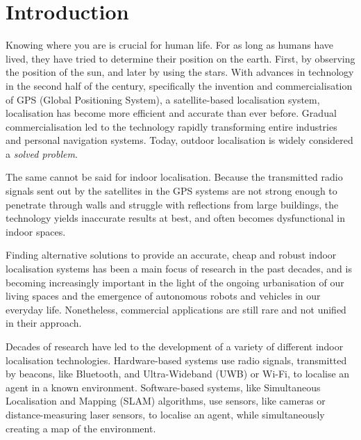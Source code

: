 \documentclass[a4paper]{article}
\begin{document}
  
  \newpage

  \tableofcontents
  \listoftables
  \listoffigures
  \newpage

  \begin{abstract} %
    \lipsum[1]
  \end{abstract}

  \section{Introduction}
  \label{sec:introduction}

  Knowing where you are is crucial for human life. For as long as humans have
  lived, they have tried to determine their position on the earth. First, by
  observing the position of the sun, and later by using the stars. With advances
  in technology in the second half of the  century, specifically the
  invention and commercialisation of GPS (Global Positioning System), a
  satellite-based localisation system, localisation has become more efficient
  and accurate than ever before. Gradual commercialisation led to the technology
  rapidly transforming entire industries and personal navigation systems. Today,
  outdoor localisation is widely considered a \textit{solved problem}.

  The same cannot be said for indoor localisation. Because the transmitted radio
  signals sent out by the satellites in the GPS systems are not strong enough to
  penetrate through walls and struggle with reflections from large buildings,
  the technology yields inaccurate results at best, and often becomes
  dysfunctional in indoor spaces.

  Finding alternative solutions to provide an accurate, cheap and robust indoor
  localisation systems has been a main focus of research in the past decades,
  and is becoming increasingly important in the light of the ongoing urbanisation
  of our living spaces and the emergence of autonomous robots and vehicles in
  our everyday life. Nonetheless, commercial applications are still rare and not
  unified in their approach.

  Decades of research have led to the development of a variety of different
  indoor localisation technologies. Hardware-based systems use radio signals,
  transmitted by beacons, like Bluetooth, and Ultra-Wideband
  (UWB) or Wi-Fi, to localise an agent in a known environment. Software-based
  systems, like Simultaneous Localisation and Mapping (SLAM) algorithms, use
  sensors, like cameras or distance-measuring laser sensors, to localise an
  agent, while simultaneously creating a map of the environment. 
\end{document}
